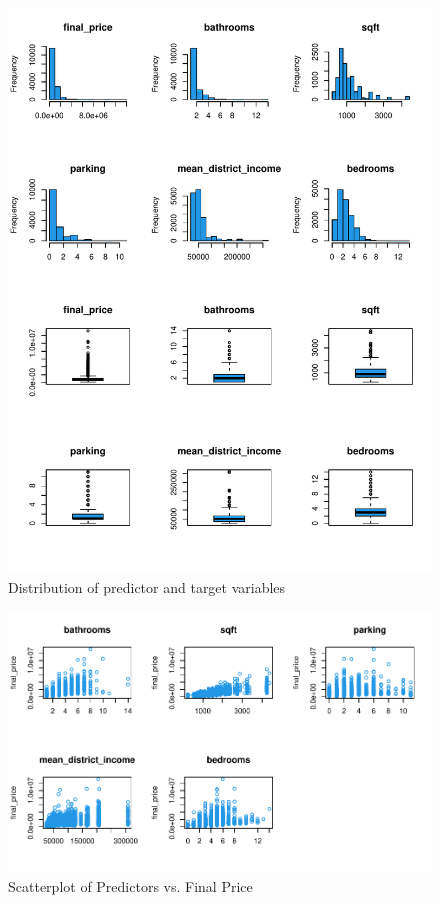 \documentclass[11pt,]{article}
\begin{document}
\begin{figure}

{\centering \includegraphics{House_prices_report_files/figure-latex/histogram-1} 

}

\caption{Distribution of predictor and target variables\label{sec:fig4}}\label{fig:histogram}
\end{figure}
\begin{figure}

{\centering \includegraphics{House_prices_report_files/figure-latex/linear correlation-1} 

}

\caption{Scatterplot of Predictors vs. Final Price\label{sec:fig5}}\label{fig:linear correlation}
\end{figure}
\end{document}
